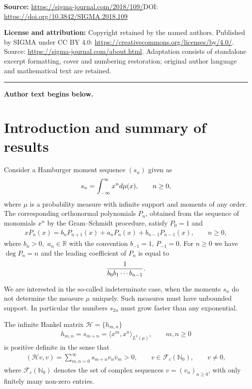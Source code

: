 \documentclass[11pt]{article}
\numberwithin{equation}{section}
\begin{document}
\noindent\textbf{Source:} \url{https://sigma-journal.com/2018/109/}\quad DOI: \url{https://doi.org/10.3842/SIGMA.2018.109}\par
\noindent\textbf{License and attribution:} Copyright retained by the named authors. Published by SIGMA under CC BY 4.0: \url{https://creativecommons.org/licenses/by/4.0/}. Source: \url{https://sigma-journal.com/about.html}. Adaptation consists of standalone excerpt formatting, cover and numbering restoration; original author language and mathematical text are retained.\par
\medskip\hrule\medskip\noindent\textbf{Author text begins below.}\par
\setcounter{section}{0}
\setcounter{subsection}{0}
\setcounter{subsubsection}{0}
\setcounter{thm}{0}
\setcounter{equation}{0}
\section{Introduction and summary of results}
Consider a Hamburger moment sequence $(s_n)$ given as
\begin{gather*}
s_n=\int_{-\infty}^\infty x^n{\rm d}\mu(x), \qquad n\ge 0,
\end{gather*}
 where $\mu$ is a probability measure with infinite support and moments of any order. The corresponding orthonormal polynomials $P_n$, obtained from the sequence of monomials $x^n$ by the Gram--Schmidt procedure, satisfy $P_0=1$ and
\begin{gather}\label{eq:rec}
xP_n(x)=b_nP_{n+1}(x)+a_nP_n(x)+b_{n-1}P_{n-1}(x),\qquad n\ge 0,
\end{gather}
where $b_n>0, $ $a_n\in\mathbb{R}$ with the convention $b_{-1}=1$, $P_{-1}=0$. For $n\ge 0$ we have $\deg P_n=n$ and the leading coefficient of $P_n$ is equal to
\begin{gather}\label{eq:lead}
{1\over b_0b_1\cdots b_{n-1}}.
\end{gather}

We are interested in the so-called indeterminate case, when the moments $s_n$ do not determine the measure $\mu$ uniquely. Such measures must have unbounded support. In particular the numbers $s_{2n}$ must grow faster than any exponential.

The infinite Hankel matrix $\mathcal H=\{h_{m,n}\}$
 \begin{gather*}
h_{m,n}=s_{m+n}=\big\langle x^m,x^n\big\rangle_{L^2(\mu)},\qquad m,n\ge 0
\end{gather*}
is positive definite in the sense that
\begin{gather}\label{eq:Hank}
(\mathcal Hv,v)=\sum_{m,n=0}^\infty s_{m+n}v_n\overline{v}_m>0,\qquad v\in \mathcal{F}_c(\mathbb{N}_0), \qquad v\neq 0,
\end{gather}
where $\mathcal{F}_c(\mathbb{N}_0)$ denotes the set of complex sequences $v=(v_n)_{n\ge 0}$, with only finitely many non-zero entries.
\end{document}

